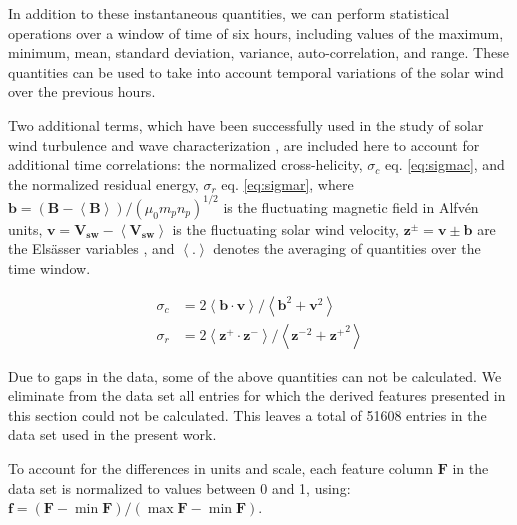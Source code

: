 In addition to these instantaneous quantities, we can perform statistical operations over a window of time of six hours, including values of the maximum, minimum, mean, standard deviation, variance, auto-correlation, and range. These quantities can be used to take into account temporal variations of the solar wind over the previous hours.

Two additional terms, which have been successfully used in the study of solar wind turbulence and wave characterization \citep{Zhao2018,Adhikari2020,Magyar2019}, are included here to account for additional time correlations: the normalized cross-helicity, $\sigma_c$ eq. \eqref{eq:sigmac}, and the normalized residual energy, $\sigma_r$ eq. \eqref{eq:sigmar}, where $\boldsymbol{b} = \left(\boldsymbol{B}- \boldsymbol{\left<B\right>}\right)/(\mu_0m_pn_p)^{1/2}$ is the fluctuating magnetic field in Alfv\'en units, $\boldsymbol{v} = \boldsymbol{V_{sw}}- \boldsymbol{\left<V_{sw}\right>}$ is the fluctuating solar wind velocity, $\boldsymbol{z^\pm} = \boldsymbol{v} \pm \boldsymbol{b}$ are the Els\"asser variables \citep{PhysRev.79.183}, and $\left<.\right>$ denotes the averaging of quantities over the time window.

\begin{align}
\sigma_c & = 2 \left< \boldsymbol{b}\cdot\boldsymbol{v}\right>/\left<\boldsymbol{b}^2 + \boldsymbol{v}^2\right> \label{eq:sigmac} \\
\sigma_r & = 2 \left< \boldsymbol{z^+}\cdot\boldsymbol{z^-}\right>/\left<\boldsymbol{z^-}^2 + \boldsymbol{z^+}^2\right> \label{eq:sigmar}
\end{align}

Due to gaps in the data, some of the above quantities can not be calculated. We eliminate from the data set all entries for which the derived features presented in this section could not be calculated. This leaves a total of 51608 entries in the data set used in the present work.

To account for the differences in units and scale, each feature column $\boldsymbol{F}$ in the data set is normalized to values between 0 and 1, using: $\boldsymbol{f}=\left(\boldsymbol{F}-\min{\boldsymbol{F}}\right) /\left(\max{\boldsymbol{F}}-\min{\boldsymbol{F}}\right)$.

